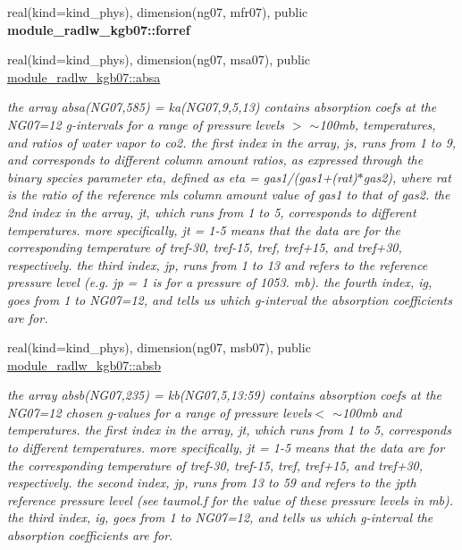 \begin{Indent}
\begin{DoxyCompactItemize}
real(kind=kind\+\_\+phys), dimension(ng07, mfr07), public {\bfseries module\+\_\+radlw\+\_\+kgb07\+::forref}
\item 
real(kind=kind\+\_\+phys), dimension(ng07, msa07), public \hyperlink{group__module__radlw__kgbnn_gaf106cf054f7496a092ceb0c399753a36}{module\+\_\+radlw\+\_\+kgb07\+::absa}
\begin{DoxyCompactList}\small\item\em the array absa(\+N\+G07,585) = ka(\+N\+G07,9,5,13) contains absorption coefs at the N\+G07=12 g-\/intervals for a range of pressure levels $>$ $\sim$100mb, temperatures, and ratios of water vapor to co2. the first index in the array, js, runs from 1 to 9, and corresponds to different column amount ratios, as expressed through the binary species parameter eta, defined as eta = gas1/(gas1+(rat)$\ast$gas2), where rat is the ratio of the reference mls column amount value of gas1 to that of gas2. the 2nd index in the array, jt, which runs from 1 to 5, corresponds to different temperatures. more specifically, jt = 1-\/5 means that the data are for the corresponding temperature of tref-\/30, tref-\/15, tref, tref+15, and tref+30, respectively. the third index, jp, runs from 1 to 13 and refers to the reference pressure level (e.\+g. jp = 1 is for a pressure of 1053. mb). the fourth index, ig, goes from 1 to N\+G07=12, and tells us which g-\/interval the absorption coefficients are for. \end{DoxyCompactList}\item 
real(kind=kind\+\_\+phys), dimension(ng07, msb07), public \hyperlink{group__module__radlw__kgbnn_gab0478438e9bbe64401aa492510f8d4bb}{module\+\_\+radlw\+\_\+kgb07\+::absb}
\begin{DoxyCompactList}\small\item\em the array absb(\+N\+G07,235) = kb(\+N\+G07,5,13\+:59) contains absorption coefs at the N\+G07=12 chosen g-\/values for a range of pressure levels$<$ $\sim$100mb and temperatures. the first index in the array, jt, which runs from 1 to 5, corresponds to different temperatures. more specifically, jt = 1-\/5 means that the data are for the corresponding temperature of tref-\/30, tref-\/15, tref, tref+15, and tref+30, respectively. the second index, jp, runs from 13 to 59 and refers to the jpth reference pressure level (see taumol.\+f for the value of these pressure levels in mb). the third index, ig, goes from 1 to N\+G07=12, and tells us which g-\/interval the absorption coefficients are for. \end{DoxyCompactList}\item 

\end{DoxyCompactItemize}
\end{Indent}
